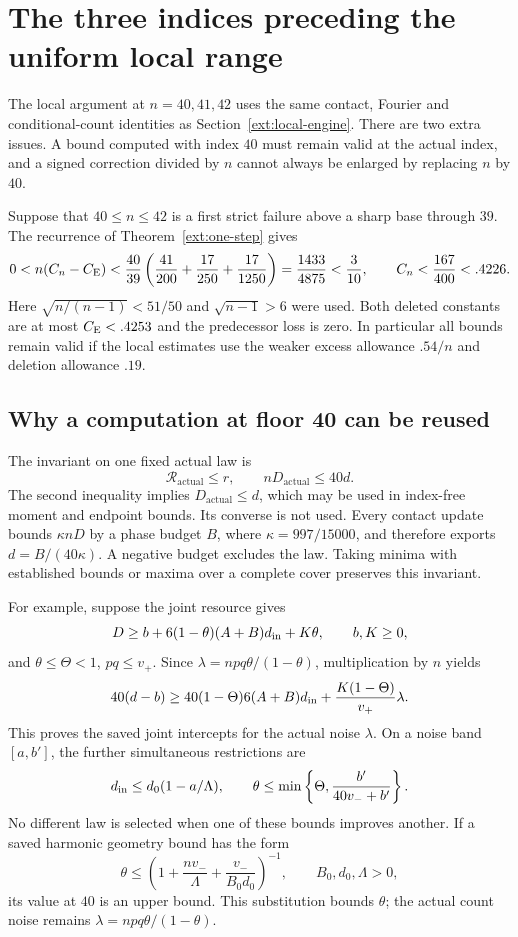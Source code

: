 \section{The three indices preceding the uniform local range}
\label{ext:floor40}

The local argument at $n=40,41,42$ uses the same contact, Fourier and
conditional-count identities as Section~\ref{ext:local-engine}. There are
two extra issues. A bound computed with index $40$ must remain valid at
the actual index, and a signed correction divided by $n$ cannot always
be enlarged by replacing $n$ by $40$.

Suppose that $40\le n\le42$ is a first strict failure above a sharp base
through $39$. The recurrence of Theorem~\ref{ext:one-step} gives
\[
 0<n(C_n-C_{\mathrm E})<\frac{40}{39}
 \left(\frac{41}{200}+\frac{17}{250}+\frac{17}{1250}\right)
 =\frac{1433}{4875}<\frac3{10},\qquad C_n<\frac{167}{400}<.4226.
\]
Here $\sqrt{n/(n-1)}<51/50$ and $\sqrt{n-1}>6$ were used.
Both deleted constants are at most $C_{\mathrm E}<.4253$ and the predecessor loss
is zero. In particular all bounds remain valid if the local estimates
use the weaker excess allowance $.54/n$ and deletion allowance $.19$.

\subsection{Why a computation at floor 40 can be reused}

The invariant on one fixed actual law is
\begin{equation}\label{ext:floor40-invariant}
 \mathcal R_{\mathrm{actual}}\le r,\qquad nD_{\mathrm{actual}}\le40d.
\end{equation}
The second inequality implies $D_{\mathrm{actual}}\le d$, which may be
used in index-free moment and endpoint bounds. Its converse is not used.
Every contact update bounds $\kappa nD$ by a phase budget $B$, where
$\kappa=997/15000$, and therefore exports $d=B/(40\kappa)$.
A negative budget excludes the law. Taking minima with established
bounds or maxima over a complete cover preserves this invariant.

For example, suppose the joint resource gives
\[
 D\ge b+6(1-\theta)(A+B)d_{\rm in}+K\theta,
 \qquad b,K\ge0,
\]
and $\theta\le\Theta<1$, $pq\le v_+$. Since
$\lambda=npq\theta/(1-\theta)$, multiplication by $n$ yields
\[
 40(d-b)\ge40(1-\Theta)6(A+B)d_{\rm in}
            +\frac{K(1-\Theta)}{v_+}\lambda.
\]
This proves the saved joint intercepts for the actual noise $\lambda$.
On a noise band $[a,b']$, the further simultaneous restrictions are
\[
 d_{\rm in}\le d_0(1-a/\Lambda),\qquad
 \theta\le\min\left\{\Theta,\frac{b'}{40v_-+b'}\right\}.
\]
No different law is selected when one of these bounds improves another.
If a saved harmonic geometry bound has the form
\[
 \theta\le\left(1+\frac{nv_-}{\Lambda}
                   +\frac{v_-}{B_0d_0}\right)^{-1},
 \qquad B_0,d_0,\Lambda>0,
\]
its value at $40$ is an upper bound. This substitution bounds $\theta$;
the actual count noise remains $\lambda=npq\theta/(1-\theta)$.

